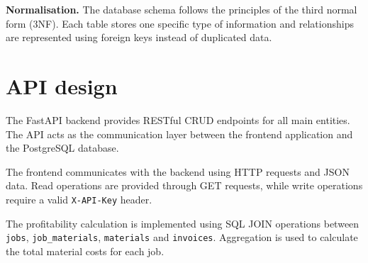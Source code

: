 \documentclass[11pt,a4paper]{article}
\begin{document}
\textbf{Normalisation.} The database schema follows the principles of the third normal form (3NF).
Each table stores one specific type of information and relationships are
represented using foreign keys instead of duplicated data.

\section{API design}

The FastAPI backend provides RESTful CRUD endpoints for all main entities.
The API acts as the communication layer between the frontend application and
the PostgreSQL database.

The frontend communicates with the backend using HTTP requests and JSON data.
Read operations are provided through GET requests, while write operations
require a valid \texttt{X-API-Key} header.

The profitability calculation is implemented using SQL JOIN operations between
\texttt{jobs}, \texttt{job\_materials}, \texttt{materials} and
\texttt{invoices}. Aggregation is used to calculate the total material costs
for each job.
\end{document}
